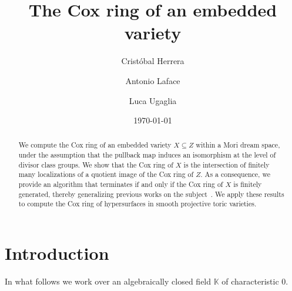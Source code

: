 \documentclass{amsart}
\title{The Cox ring of an embedded variety}
\author[C.~Herrera]{Crist\'obal Herrera}
\author[A.~Laface]{Antonio Laface}
\author[L.~Ugaglia]{Luca Ugaglia}
\date{\today}
\theoremstyle{definition}
\theoremstyle{remark}
\begin{document}
\begin{abstract}
We compute the Cox ring of an embedded variety $X \subseteq Z$ within a Mori dream space, under the assumption that the pullback map induces an isomorphism at the level of divisor class groups. We show that the Cox ring of $X$ is the intersection of finitely many localizations of a quotient image of the Cox ring of $Z$. As a consequence, we provide an algorithm that terminates if and only if the Cox ring of $X$ is finitely generated, thereby generalizing previous works on the subject~\cites{al,hau,ott,abban2}. We apply these results to compute the Cox ring of hypersurfaces in smooth projective toric varieties.
\end{abstract}

\maketitle

\section*{Introduction}
In what follows we work over an algebraically closed field $\mathbb K$ of characteristic $0$.
\end{document}
